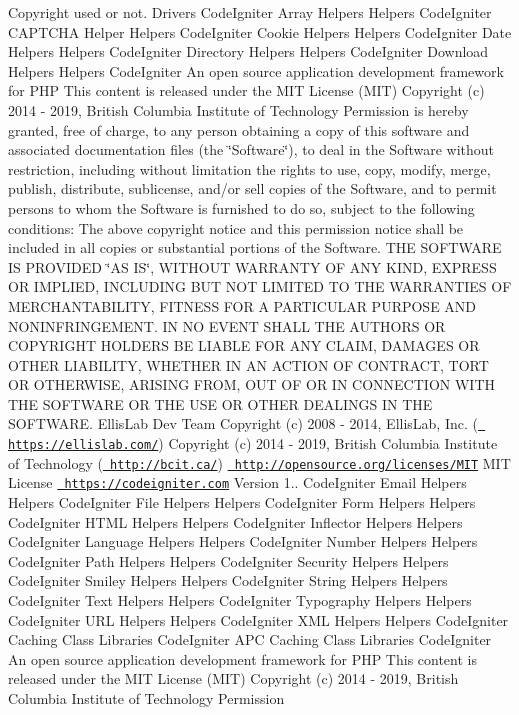 \begin{DoxyCopyright}{Copyright}
used or not.  Drivers Code\+Igniter Array Helpers  Helpers Code\+Igniter C\+A\+P\+T\+C\+HA Helper  Helpers Code\+Igniter Cookie Helpers  Helpers Code\+Igniter Date Helpers  Helpers Code\+Igniter Directory Helpers  Helpers Code\+Igniter Download Helpers  Helpers Code\+Igniter An open source application development framework for P\+HP This content is released under the M\+IT License (M\+IT) Copyright (c) 2014 -\/ 2019, British Columbia Institute of Technology Permission is hereby granted, free of charge, to any person obtaining a copy of this software and associated documentation files (the \char`\"{}\+Software\char`\"{}), to deal in the Software without restriction, including without limitation the rights to use, copy, modify, merge, publish, distribute, sublicense, and/or sell copies of the Software, and to permit persons to whom the Software is furnished to do so, subject to the following conditions\+: The above copyright notice and this permission notice shall be included in all copies or substantial portions of the Software. T\+HE S\+O\+F\+T\+W\+A\+RE IS P\+R\+O\+V\+I\+D\+ED \char`\"{}\+A\+S I\+S\char`\"{}, W\+I\+T\+H\+O\+UT W\+A\+R\+R\+A\+N\+TY OF A\+NY K\+I\+ND, E\+X\+P\+R\+E\+SS OR I\+M\+P\+L\+I\+ED, I\+N\+C\+L\+U\+D\+I\+NG B\+UT N\+OT L\+I\+M\+I\+T\+ED TO T\+HE W\+A\+R\+R\+A\+N\+T\+I\+ES OF M\+E\+R\+C\+H\+A\+N\+T\+A\+B\+I\+L\+I\+TY, F\+I\+T\+N\+E\+SS F\+OR A P\+A\+R\+T\+I\+C\+U\+L\+AR P\+U\+R\+P\+O\+SE A\+ND N\+O\+N\+I\+N\+F\+R\+I\+N\+G\+E\+M\+E\+NT. IN NO E\+V\+E\+NT S\+H\+A\+LL T\+HE A\+U\+T\+H\+O\+RS OR C\+O\+P\+Y\+R\+I\+G\+HT H\+O\+L\+D\+E\+RS BE L\+I\+A\+B\+LE F\+OR A\+NY C\+L\+A\+IM, D\+A\+M\+A\+G\+ES OR O\+T\+H\+ER L\+I\+A\+B\+I\+L\+I\+TY, W\+H\+E\+T\+H\+ER IN AN A\+C\+T\+I\+ON OF C\+O\+N\+T\+R\+A\+CT, T\+O\+RT OR O\+T\+H\+E\+R\+W\+I\+SE, A\+R\+I\+S\+I\+NG F\+R\+OM, O\+UT OF OR IN C\+O\+N\+N\+E\+C\+T\+I\+ON W\+I\+TH T\+HE S\+O\+F\+T\+W\+A\+RE OR T\+HE U\+SE OR O\+T\+H\+ER D\+E\+A\+L\+I\+N\+GS IN T\+HE S\+O\+F\+T\+W\+A\+RE.  Ellis\+Lab Dev Team  Copyright (c) 2008 -\/ 2014, Ellis\+Lab, Inc. (\href{https://ellislab.com/}{\texttt{ https\+://ellislab.\+com/}})  Copyright (c) 2014 -\/ 2019, British Columbia Institute of Technology (\href{http://bcit.ca/}{\texttt{ http\+://bcit.\+ca/}})  \href{http://opensource.org/licenses/MIT}{\texttt{ http\+://opensource.\+org/licenses/\+M\+IT}} M\+IT License  \href{https://codeigniter.com}{\texttt{ https\+://codeigniter.\+com}}  Version 1..  Code\+Igniter Email Helpers  Helpers Code\+Igniter File Helpers  Helpers Code\+Igniter Form Helpers  Helpers Code\+Igniter H\+T\+ML Helpers  Helpers Code\+Igniter Inflector Helpers  Helpers Code\+Igniter Language Helpers  Helpers Code\+Igniter Number Helpers  Helpers Code\+Igniter Path Helpers  Helpers Code\+Igniter Security Helpers  Helpers Code\+Igniter Smiley Helpers  Helpers Code\+Igniter String Helpers  Helpers Code\+Igniter Text Helpers  Helpers Code\+Igniter Typography Helpers  Helpers Code\+Igniter U\+RL Helpers  Helpers Code\+Igniter X\+ML Helpers  Helpers Code\+Igniter Caching Class  Libraries Code\+Igniter A\+PC Caching Class  Libraries Code\+Igniter An open source application development framework for P\+HP This content is released under the M\+IT License (M\+IT) Copyright (c) 2014 -\/ 2019, British Columbia Institute of Technology Permission 
\end{DoxyCopyright}
